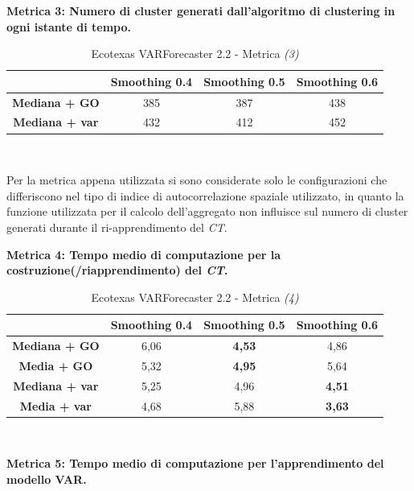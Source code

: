 \documentclass[12pt,a4paper,oneside,openright]{book}
\begin{document}
\textbf{Metrica 3: Numero di cluster generati dall'algoritmo di clustering in ogni istante di tempo.}

\medskip

\begin{table}[H]
\centering
\begin{tabular}[H]{|c|c|c|c|}
\hline
& Smoothing 0.4 & Smoothing 0.5 & Smoothing 0.6\\
\hline
\textbf{Mediana + GO} & 385 & 387 & 438\\ 
\hline
\textbf{Mediana + var} & 432 & 412 & 452\\ 
\hline
\end{tabular} \\
\caption{Ecotexas VARForecaster 2.2 - Metrica \textit{(3)}}
\end{table}

\medskip

Per la metrica appena utilizzata si sono considerate solo le configurazioni che differiscono nel tipo di indice di autocorrelazione spaziale utilizzato, in quanto la funzione utilizzata per il calcolo dell'aggregato non influisce sul numero di cluster generati durante il ri-apprendimento del \textit{CT}.

\newpage

\textbf{Metrica 4: Tempo medio di computazione per la costruzione(/riapprendimento) del \textit{CT}.}

\medskip

\begin{table}[H]
\centering
\begin{tabular}[H]{|c|c|c|c|}
\hline
& Smoothing 0.4 & Smoothing 0.5 & Smoothing 0.6\\
\hline
\textbf{Mediana + GO} & 6,06 & \textbf{4,53} & 4,86\\ 
\hline
\textbf{Media + GO} & 5,32 & \textbf{4,95} & 5,64\\ 
\hline
\textbf{Mediana + var} & 5,25 & 4,96 & \textbf{4,51}\\ 
\hline
\textbf{Media + var} & 4,68 & 5,88 & \textbf{3,63}\\ 
\hline
\end{tabular} \\
\caption{Ecotexas VARForecaster 2.2 - Metrica \textit{(4)}}
\end{table}

\medskip

\textbf{Metrica 5: Tempo medio di computazione per l'apprendimento del modello VAR.}

\medskip
\end{document}
